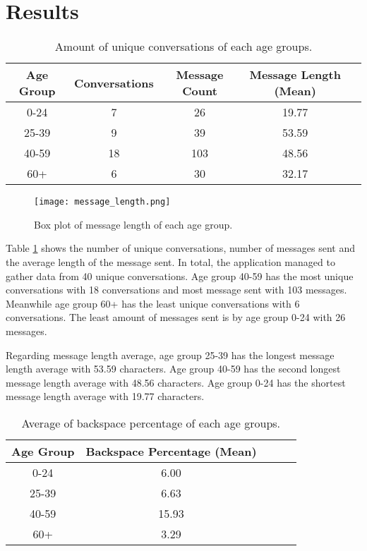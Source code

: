 \section{Results}


\begin{table}[h]
    \centering
    \begin{tabular}{ccccc}
    \toprule
    \textbf{Age Group} & {Conversations} & Message Count & Message Length (Mean) \\
    \midrule
    0-24     & 7 & 26 & 19.77 \\
    25-39    & 9 & 39 & 53.59\\
    40-59    & 18 & 103 & 48.56\\
    60+      & 6 & 30 & 32.17 \\
    \bottomrule
    \end{tabular}
    \caption{Amount of unique conversations of each age groups.}
    \label{tab:unique_conversations}
\end{table}

\begin{figure}[h!]
    \centering
    \texttt{[image: message\_length.png]}
    \caption{Box plot of message length of each age group.}
    \label{box_plot_message_length}
\end{figure}


Table \ref{tab:unique_conversations} shows the number of unique conversations, number of messages sent and the average length of the message sent.
In total, the application managed to gather data from 40 unique conversations.
Age group 40-59 has the most unique conversations with 18 conversations and most message sent with 103 messages.
Meanwhile age group 60+ has the least unique conversations with 6 conversations.
The least amount of messages sent is by age group 0-24 with 26 messages.

Regarding message length average, age group 25-39 has the longest message length average with 53.59 characters.
Age group 40-59 has the second longest message length average with 48.56 characters.
Age group 0-24 has the shortest message length average with 19.77 characters.

\begin{table}[h]
    \centering
    \begin{tabular}{ccccc}
    \toprule
    \textbf{Age Group} & Backspace Percentage (Mean) \\
    \midrule
    0-24     & 6.00 \\
    25-39    & 6.63 \\
    40-59    & 15.93 \\
    60+      & 3.29 \\
    \bottomrule
    \end{tabular}
    \caption{Average of backspace percentage of each age groups.}
    \label{tab:backspace_percentage}
\end{table}

